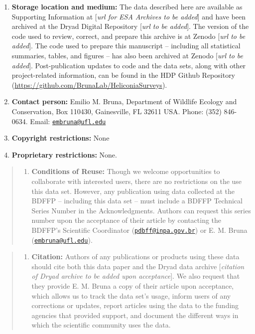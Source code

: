 \documentclass[
  man, donotrepeattitle,floatsintext]{apa6}
\providecommand{\tightlist}{%
  \setlength{\itemsep}{0pt}\setlength{\parskip}{0pt}}
\begin{document}
\begin{enumerate}
\def\labelenumi{\arabic{enumi}.}
\item
  \textbf{Storage location and medium:} The data described here are available as Supporting Information at {[}\emph{url for ESA Archives to be added}{]} and have been archived at the Dryad Digital Repository {[}\emph{url to be added}{]}. The version of the code used to review, correct, and prepare this archive is at Zenodo {[}\emph{url to be added}{]}. The code used to prepare this manuscript -- including all statistical summaries, tables, and figures -- has also been archived at Zenodo {[}\emph{url to be added}{]}. Post-publication updates to code and the data sets, along with other project-related information, can be found in the HDP Github Repository (\url{https://github.com/BrunaLab/HeliconiaSurveys}).
\item
  \textbf{Contact person:} Emilio M. Bruna, Department of Wildlife Ecology and Conservation, Box 110430, Gainesville, FL 32611 USA. Phone: (352) 846-0634. Email: \href{mailto:embruna@ufl.edu}{\nolinkurl{embruna@ufl.edu}}
\item
  \textbf{Copyright restrictions:} None
\item
  \textbf{Proprietary restrictions:} None.
\end{enumerate}

\begin{quote}
\begin{enumerate}
\def\labelenumi{\alph{enumi}.}
\tightlist
\item
  \textbf{Conditions of Reuse:} Though we welcome opportunities to collaborate with interested users, there are no restrictions on the use this data set. However, any publication using data collected at the BDFFP -- including this data set -- must include a BDFFP Technical Series Number in the Acknowledgments. Authors can request this series number upon the acceptance of their article by contacting the BDFFP's Scientific Coordinator (\href{mailto:pdbff@inpa.gov.br}{\nolinkurl{pdbff@inpa.gov.br}}) or E. M. Bruna (\href{mailto:embruna@ufl.edu}{\nolinkurl{embruna@ufl.edu}}).
\end{enumerate}
\end{quote}

\begin{quote}
\begin{enumerate}
\def\labelenumi{\alph{enumi}.}
\setcounter{enumi}{1}
\tightlist
\item
  \textbf{Citation:} Authors of any publications or products using these data should cite both this data paper and the Dryad data archive {[}\emph{citation of Dryad archive to be added upon acceptance}{]}. We also request that they provide E. M. Bruna a copy of their article upon acceptance, which allows us to track the data set's usage, inform users of any corrections or updates, report articles using the data to the funding agencies that provided support, and document the different ways in which the scientific community uses the data.
\end{enumerate}
\end{quote}
\end{document}
